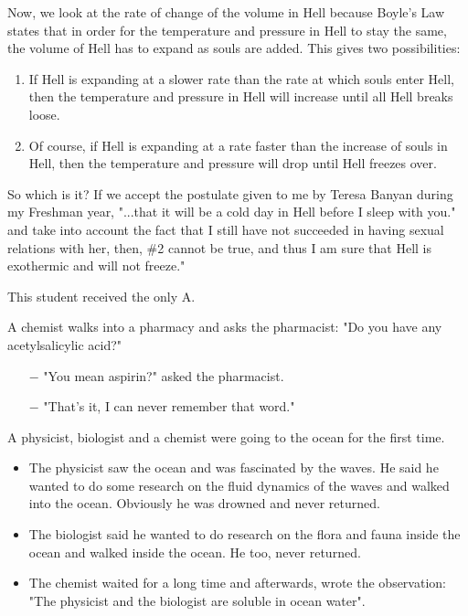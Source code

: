 Now, we look at the rate of change of the volume in Hell because Boyle's Law states that in order for the temperature and pressure in Hell to stay the same, the volume of Hell has to expand as souls are added. This gives two possibilities:

\begin{enumerate}
	\item If Hell is expanding at a slower rate than the rate at which souls enter Hell, then the temperature and pressure in Hell will increase until all Hell breaks loose.

	\item Of course, if Hell is expanding at a rate faster than the increase of souls in Hell, then the temperature and pressure will drop until Hell freezes over.
\end{enumerate}

So which is it? If we accept the postulate given to me by Teresa Banyan during my Freshman year, "...that it will be a cold day in Hell before I sleep with you." and take into account the fact that I still have not succeeded in having sexual relations with her, then, \#2 cannot be true, and thus I am sure that Hell is exothermic and will not freeze."

This student received the only A.
\begin{center}\underline{\hspace{5 cm}}\end{center}

A chemist walks into a pharmacy and asks the pharmacist: "Do you have any acetylsalicylic acid?"

\begin{itemize}
	\item[$-$] "You mean aspirin?" asked the pharmacist.

	\item[$-$] "That's it, I can never remember that word."
\end{itemize}
\begin{center}\underline{\hspace{5 cm}}\end{center}

A physicist, biologist and a chemist were going to the ocean for the first time. 

\begin{itemize}
	\item The physicist saw the ocean and was fascinated by the waves. He said he wanted to do some research on the fluid dynamics of the waves and walked into the ocean. Obviously he was drowned and never returned. 

	\item The biologist said he wanted to do research on the flora and fauna inside the ocean and walked inside the ocean. He too, never returned. 

	\item The chemist waited for a long time and afterwards, wrote the observation: "The physicist and the biologist are soluble in ocean water".
\end{itemize}
\begin{center}\underline{\hspace{5 cm}}\end{center}

